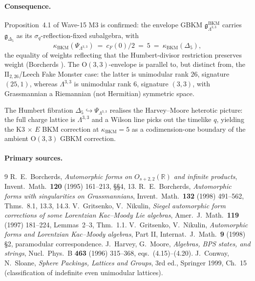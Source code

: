 \documentclass[11pt]{article}
\providecommand{\Lat}{\Lambda}
\providecommand{\R}{\mathbb{R}}
\providecommand{\gBKM}{\mathfrak{g}}
\providecommand{\OO}{\mathrm{O}}
\providecommand{\II}{\mathrm{II}}
\providecommand{\kBKM}{\kappa_{\mathrm{BKM}}}
\providecommand{\Delfive}{\Delta_{5}}
\theoremstyle{plain}
\theoremstyle{definition}
\begin{document}
\paragraph{Consequence.} Proposition~4.1 of Wave-15 M3 is confirmed:
the envelope GBKM $\gBKM^{\mathrm{BKM}}_{\Lat^{3,3}}$ carries
$\gBKM_{\Delfive}$ as its $\sigma_q$-reflection-fixed subalgebra, with
\[
\kBKM(\Psi_{\Lat^{3,3}})\ =\ c_F(0)/2\ =\ 5
\ =\ \kBKM(\Delfive),
\]
the equality of weights reflecting that the Humbert-divisor
restriction preserves weight (Borcherds \cite[Thm.~8.1]{Bor98}). The
$\OO(3,3)$-envelope is parallel to, but distinct from, the
$\II_{2,26}$/Leech Fake Monster case: the latter is unimodular
rank $26$, signature $(25,1)$, whereas $\Lat^{3,3}$ is unimodular
rank $6$, signature $(3,3)$, with Grassmannian a Riemannian (not
Hermitian) symmetric space.

The Humbert fibration
$\Delfive\hookrightarrow\Psi_{\Lat^{3,3}}$ realises the Harvey--Moore
\cite[\S 4]{HM96} heterotic picture: the full charge lattice is
$\Lat^{3,3}$ and a Wilson line picks out the timelike $q$, yielding
the K3 $\times$ $E$ BKM correction at $\kBKM=5$ as a codimension-one
boundary of the ambient $\OO(3,3)$ GBKM correction.

\paragraph{Primary sources.}
\begin{thebibliography}{9}
 R.~E.~Borcherds,
\emph{Automorphic forms on $O_{s+2,2}(\R)$ and infinite products},
Invent.~Math.~\textbf{120} (1995) 161--213, \S\S 4, 13.
 R.~E.~Borcherds,
\emph{Automorphic forms with singularities on Grassmannians},
Invent.~Math.~\textbf{132} (1998) 491--562, Thms.~8.1, 13.3, 14.3.
 V.~Gritsenko, V.~Nikulin,
\emph{Siegel automorphic form corrections of some Lorentzian
Kac--Moody Lie algebras}, Amer.~J.~Math.~\textbf{119} (1997)
181--224, Lemmas~2--3, Thm.~1.1.
 V.~Gritsenko, V.~Nikulin,
\emph{Automorphic forms and Lorentzian Kac--Moody algebras}, Part II,
Internat.~J.~Math.~\textbf{9} (1998) \S 2, paramodular correspondence.
 J.~Harvey, G.~Moore,
\emph{Algebras, BPS states, and strings},
Nucl.~Phys.~B \textbf{463} (1996) 315--368, eqs.~(4.15)--(4.20).
 J.~Conway, N.~Sloane,
\emph{Sphere Packings, Lattices and Groups}, 3rd ed., Springer 1999,
Ch.~15 (classification of indefinite even unimodular lattices).
\end{thebibliography}
\end{document}
